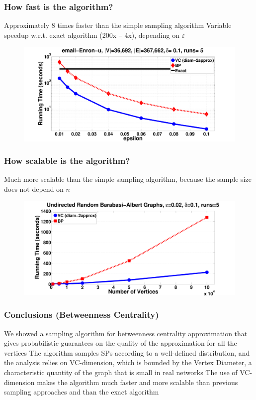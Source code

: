 \begin{frame}
  \frametitle{How fast is the algorithm?}
  Approximately 8 times faster than the simple sampling algorithm
  \vfill
  Variable speedup w.r.t. exact algorithm (200x -- 4x), depending on
  $\varepsilon$
  \vfill
  \begin{figure}[H]
    \centering
    \includegraphics[scale=0.22]{imgs/email-Enron-time.pdf}
  \end{figure}
\end{frame}

\begin{frame}
  \frametitle{How scalable is the algorithm?}
  Much more scalable than the simple sampling algorithm, because the sample
  size does not depend on $n$
  \vfill
  \begin{figure}[H]
    \centering
    \includegraphics[scale=0.22]{imgs/random-time.pdf}
  \end{figure}
\end{frame}

\begin{frame}
  \frametitle{Conclusions (Betweenness Centrality)}
  \vfill
  We showed a sampling algorithm for betweenness centrality approximation that
  gives probabilistic guarantees on the quality of the approximation for all
  the vertices
  \vfill
  The algorithm samples SPs according to a well-defined distribution, and
  the analysis relies on VC-dimension, which is bounded by the Vertex Diameter,
  a characteristic quantity of the graph that is small in real networks
  \vfill
  The use of VC-dimension makes the algorithm much faster and more scalable
  than previous sampling approaches and than the exact algorithm
\end{frame}

